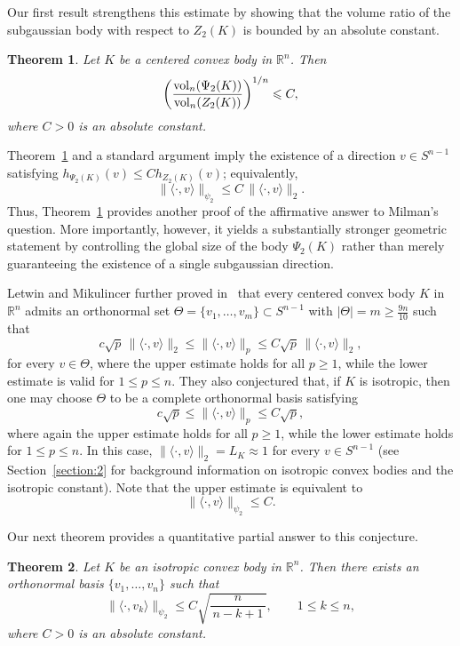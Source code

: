 \documentclass[11pt,leqno]{article}
\newtheorem{theorem}{Theorem}[section]
\theoremstyle{definition}
\numberwithin{equation}{section}
\newcommand{\ls}{\leqslant}
\newcommand{\gr}{\geqslant}
\begin{document}
Our first result strengthens this estimate by showing that the volume ratio of the subgaussian body with respect to $Z_2(K)$ 
is bounded by an absolute constant.

\begin{theorem}\label{th:vol-ratio-psi2-body}Let $K$ be a centered convex body in $\mathbb{R}^n$. Then
\[\left(\frac{{\rm vol}_n(\Psi_2(K))}{{\rm vol}_n(Z_2(K))}\right)^{1/n}\ls C,\]
where $C>0$ is an absolute constant.
\end{theorem}

Theorem~\ref{th:vol-ratio-psi2-body} and a standard argument imply the existence of a direction
$v\in S^{n-1}$ satisfying $h_{\Psi_2(K)}(v)\ls  Ch_{Z_2(K)}(v)$; equivalently,
\[\|\langle\cdot,v\rangle\|_{\psi_2}\ls C\,\|\langle\cdot,v\rangle\|_2.\]
Thus, Theorem~\ref{th:vol-ratio-psi2-body} provides another proof of the
affirmative answer to Milman's question. More importantly, however, it yields
a substantially stronger geometric statement by controlling the global size of
the body $\Psi_2(K)$ rather than merely guaranteeing the existence of a single
subgaussian direction.

Letwin and Mikulincer further proved in~\cite{Letwin-Mikulincer-2026}
that every centered convex body $K$ in $\mathbb{R}^n$
admits an orthonormal set
$\Theta=\{v_1,\ldots ,v_m\}\subset S^{n-1}$ with $|\Theta|=m\gr \frac{9n}{10}$ such that
\[c\sqrt p\,\|\langle\cdot,v\rangle\|_2\ls\|\langle\cdot,v\rangle\|_p\ls C\sqrt p\,\|\langle\cdot,v\rangle\|_2,\]
for every $v\in \Theta$, where the upper estimate holds for all $p\gr1$,
while the lower estimate is valid for $1\ls p\ls n$.
They also conjectured that, if $K$ is isotropic, then one may choose
$\Theta$ to be a complete orthonormal basis satisfying
\[c\sqrt p\ls\|\langle\cdot,v\rangle\|_p\ls C\sqrt p,\]
where again the upper estimate holds for all $p\gr1$, while the lower
estimate holds for $1\ls p\ls n$. In this case, $\|\langle\cdot,v\rangle\|_2=L_K\approx 1$ for every $v\in S^{n-1}$ (see Section~\ref{section:2} for
background information on isotropic convex bodies and the isotropic constant). Note that the upper estimate is equivalent to
\[\|\langle\cdot,v\rangle\|_{\psi_2}\ls C.\]

Our next theorem provides a quantitative partial answer to this conjecture.

\begin{theorem}\label{th:onb-psi2}
Let $K$ be an isotropic convex body in $\mathbb{R}^n$. Then there exists
an orthonormal basis $\{v_1,\ldots,v_n\}$ such that
\[\|\langle\cdot,v_k\rangle\|_{\psi_2}\ls C\sqrt{\frac{n}{\,n-k+1\,}}, \qquad 1\ls k\ls n,\]
where $C>0$ is an absolute constant.
\end{theorem}
\end{document}
